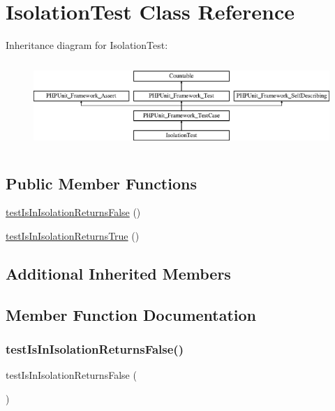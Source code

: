 \hypertarget{class_isolation_test}{}\section{Isolation\+Test Class Reference}
\label{class_isolation_test}
Inheritance diagram for Isolation\+Test\+:\begin{figure}[H]
\begin{center}
\leavevmode
\includegraphics[height=3.303835cm]{class_isolation_test}
\end{center}
\end{figure}
\subsection*{Public Member Functions}
\begin{DoxyCompactItemize}
\item 
\mbox{\hyperlink{class_isolation_test_a36a6716a8709773492b2c96dbe064bd5}{test\+Is\+In\+Isolation\+Returns\+False}} ()
\item 
\mbox{\hyperlink{class_isolation_test_aa8d1313a628c774492dbfffd159d91b5}{test\+Is\+In\+Isolation\+Returns\+True}} ()
\end{DoxyCompactItemize}
\subsection*{Additional Inherited Members}


\subsection{Member Function Documentation}
\mbox{\label{class_isolation_test_a36a6716a8709773492b2c96dbe064bd5}} 
\subsubsection{\texorpdfstring{test\+Is\+In\+Isolation\+Returns\+False()}{testIsInIsolationReturnsFalse()}}
{\footnotesize\ttfamily test\+Is\+In\+Isolation\+Returns\+False (\begin{DoxyParamCaption}{ }\end{DoxyParamCaption})}

